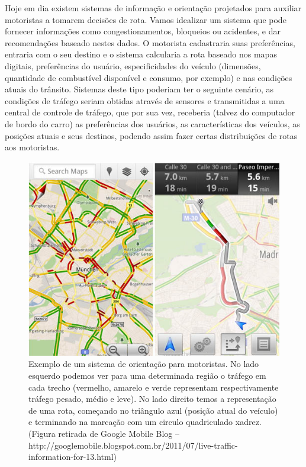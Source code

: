 Hoje em dia existem sistemas de informação e orientação projetados para 
auxiliar motoristas a tomarem decisões de rota. Vamos idealizar um 
sistema que pode fornecer informações como congestionamentos, bloqueios 
ou acidentes, e dar recomendações baseado nestes dados. O motorista 
cadastraria suas preferências, entraria com o seu destino e o sistema 
calcularia a rota baseado nos mapas digitais, preferências do usuário, 
especificidades do veículo (dimensões, quantidade de combustível 
disponível e consumo, por exemplo) e nas condições atuais do trânsito.  
Sistemas deste tipo poderiam ter o seguinte cenário, as condições de 
tráfego seriam obtidas através de sensores e transmitidas a uma central 
de controle de tráfego, que por sua vez, receberia (talvez do computador 
de bordo do carro) as preferências dos usuários, as características dos 
veículos, as posições atuais e seus destinos, podendo assim fazer certas 
distribuições de rotas aos motoristas.

\begin{figure}[h!]
  \centering
  \includegraphics[scale=0.5]{figuras/jpg/gps.jpg}
  \caption[Sistema de orientação para motoristas]{Exemplo de um sistema 
    de orientação para motoristas. No lado esquerdo podemos ver para uma 
    determinada região o tráfego em cada trecho (vermelho, amarelo e 
    verde representam respectivamente tráfego pesado, médio e leve). No 
    lado direito temos a representação de uma rota, começando no 
    triângulo azul (posição atual do veículo) e terminando na marcação 
com um circulo quadriculado xadrez.(Figura retirada de Google Mobile 
Blog -- 
http://googlemobile.blogspot.com.br/2011/07/live-traffic-information-for-13.html)}
  \label{fig:gps}
\end{figure}

